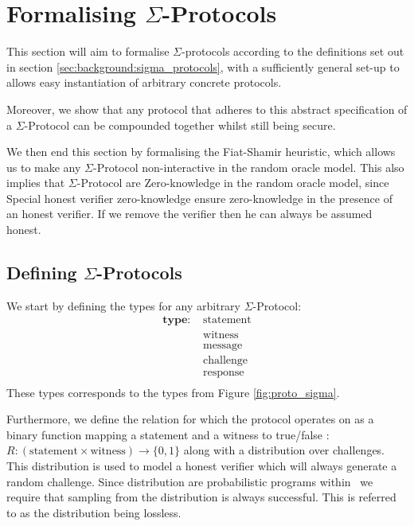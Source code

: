 \chapter{Formalising $\Sigma$-Protocols}
\label{ch:formal_sigma}
This section will aim to formalise $\Sigma$-protocols according to the
definitions set out in section \ref{sec:background:sigma_protocols}, with a
sufficiently general set-up to allows easy instantiation of arbitrary concrete
protocols.

Moreover, we show that any protocol that adheres to this abstract specification
of a $\Sigma$-Protocol can be compounded together whilst still being secure.

We then end this section by formalising the Fiat-Shamir heuristic, which allows
us to make any $\Sigma$-Protocol non-interactive in the random oracle model.
This also implies that $\Sigma$-Protocol are Zero-knowledge in the random oracle
model, since Special honest verifier zero-knowledge ensure zero-knowledge in the
presence of an honest verifier. If we remove the verifier then he can always be
assumed honest.


\section{Defining $\Sigma$-Protocols}
\label{sec:sigma:def}
We start by defining the types for any arbitrary $\Sigma$-Protocol:
\begin{align*}
  \textbf{type: } &\text{statement} \\
                  &\text{witness} \\
                  &\text{message} \\
                  &\text{challenge} \\
                  &\text{response} \\
\end{align*}
These types corresponds to the types from Figure \ref{fig:proto_sigma}.

Furthermore, we define the relation for which the protocol operates on as a binary function mapping a statement and a witness to true/false :
$R : (\text{statement} \times \text{witness}) \rightarrow \{0,1\}$ along with
a distribution over challenges. This distribution is used to model a honest
verifier which will always generate a random challenge. Since distribution are
probabilistic programs within \easycrypt\ we require that sampling from the
distribution is always successful. This is referred to as the distribution being lossless.

